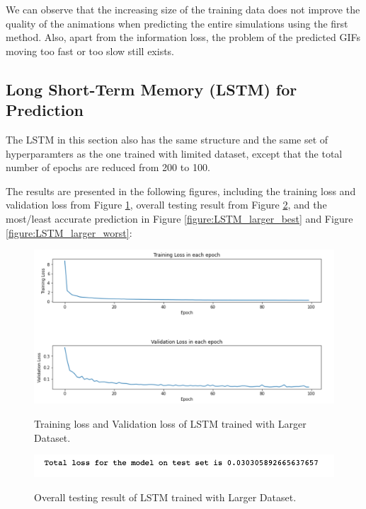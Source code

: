 We can observe that the increasing size of the training data does not improve the quality of the animations when predicting the entire simulations using the first method. Also, apart from the information loss, the problem of the predicted GIFs moving too fast or too slow still exists.


\subsection{Long Short-Term Memory (LSTM) for Prediction}

The LSTM in this section also has the same structure and the same set of hyperparamters as the one trained with limited dataset, except that the total number of epochs are reduced from 200 to 100.

The results are presented in the following figures, including the training loss and validation loss from Figure \ref{figure:LSTM_larger_losses}, overall testing result from Figure \ref{figure:LSTM_larger_testing}, and the most/least accurate prediction in Figure \ref{figure:LSTM_larger_best} and Figure \ref{figure:LSTM_larger_worst}:

\begin{figure}[H]
    \caption{Training loss and Validation loss of LSTM trained with Larger Dataset.}
    \includegraphics[scale=0.6]{figures/mantle_convection_images/larger_dataset/LSTM_trainingData.png}
    \label{figure:LSTM_larger_losses}
\end{figure}

\begin{figure}[H]
    \caption{Overall testing result of LSTM trained with Larger Dataset.}
    \includegraphics[scale=0.8]{figures/mantle_convection_images/larger_dataset/LSTM_OverallTesting.png}
    \label{figure:LSTM_larger_testing}
\end{figure}

